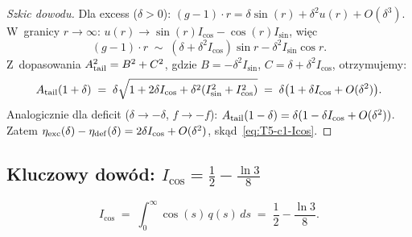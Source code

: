 \begin{proof}[Szkic dowodu]
Dla excess ($\delta > 0$):
$(g-1)\cdot r = \delta \sin(r) + \delta^2 u(r) + O(\delta^3)$.
W~granicy $r \to \infty$:
$u(r) \to \sin(r) I_{\cos} - \cos(r) I_{\sin}$, wi\k{e}c
\[
  (g-1)\cdot r \;\sim\; (\delta + \delta^2 I_{\cos})\sin r - \delta^2 I_{\sin} \cos r.
\]
Z~dopasowania $A_{\rm tail}^2 = B^2 + C^2$, gdzie $B = -\delta^2 I_{\sin}$,
$C = \delta + \delta^2 I_{\cos}$, otrzymujemy:
\[
  A_{\rm tail}(1+\delta) \;=\; \delta \sqrt{1 + 2\delta I_{\cos} + \delta^2 (I_{\sin}^2 + I_{\cos}^2)}
  \;=\; \delta \bigl(1 + \delta I_{\cos} + O(\delta^2)\bigr).
\]
Analogicznie dla deficit ($\delta \to -\delta$, $f \to -f$):
$A_{\rm tail}(1 - \delta) = \delta(1 - \delta I_{\cos} + O(\delta^2))$.
Zatem $\eta_{\rm exc}(\delta) - \eta_{\rm def}(\delta) = 2\delta I_{\cos} + O(\delta^2)$,
sk\k{a}d~\eqref{eq:T5-c1-Icos}.
\end{proof}

\subsection{Kluczowy dow\'od: $I_{\cos} = \tfrac{1}{2} - \tfrac{\ln 3}{8}$}
\label{app:T5-proof-Icos}

\begin{theorem}\label{thm:T5-Icos}
\begin{equation}\label{eq:T5-Icos-main}
  I_{\cos} \;=\; \int_0^\infty \cos(s)\,q(s)\,ds \;=\; \frac{1}{2} - \frac{\ln 3}{8}.
\end{equation}
\end{theorem}

